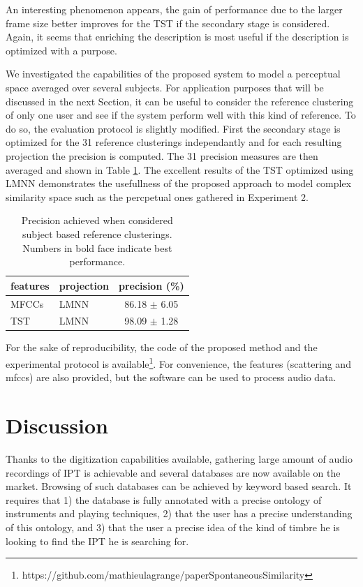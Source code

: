 \documentclass{article}
\newcommand{\ipt}{IPT\xspace}
\begin{document}
An interesting phenomenon appears, the gain of performance due to the larger frame size better improves for the TST if the secondary stage is considered. Again, it seems that enriching the description is most useful if the description is optimized with a purpose.

We investigated the capabilities of the proposed system to model a perceptual space averaged over several subjects. For application purposes that will be discussed in the next Section, it can be useful to consider the reference clustering of only one user and see if the system perform well with this kind of reference. To do so, the evaluation protocol is slightly modified. First the secondary stage is optimized for the 31 reference clusterings independantly and for each resulting projection the precision is computed. The 31 precision measures are then averaged and shown in Table \ref{tab:res2}. The excellent results of the TST optimized using LMNN demonstrates the usefullness of the proposed approach to model complex similarity space such as the percpetual ones gathered in Experiment 2.


\begin{table}
  \caption{Precision achieved when considered subject based reference clusterings. Numbers in bold face indicate best performance.}
  \label{tab:res2}
  \begin{center}
\begin{tabular}{llc}
features & projection & precision (\%) \\
  \hline
MFCCs & LMNN & 86.18 $\pm$ 6.05 \\
TST & LMNN & 98.09 $\pm$ 1.28 \\
\end{tabular}
\end{center}
\end{table}


For the sake of reproducibility, the code of the proposed method and the experimental protocol is available\footnote{https://github.com/mathieulagrange/paperSpontaneousSimilarity}. For convenience, the features (scattering and mfccs) are also provided, but the software can be used to process audio data.

\section{Discussion}\label{sec:discussion}

Thanks to the digitization capabilities available, gathering large amount of audio recordings of \ipt is achievable and several databases are now available on the market. Browsing of such databases can be achieved by keyword based search. It requires that 1) the database is fully annotated with a precise ontology of instruments and playing techniques, 2) that the user has a precise understanding of this ontology, and 3) that the user a precise idea of the kind of timbre he is looking to find the \ipt he is searching for.
\end{document}
